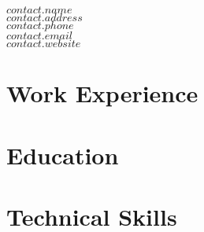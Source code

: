 \documentclass{article}
\begin{document}
$contact.name$\\
$contact.address$\\
$contact.phone$\\
$contact.email$\\
$contact.website$\\

\section*{Work Experience}

\section*{Education}

\section*{Technical Skills}
\end{document}
